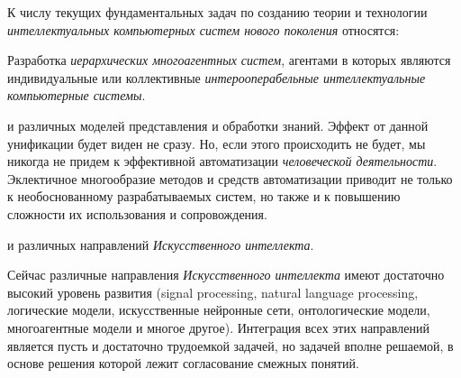 К числу текущих фундаментальных задач по созданию теории и технологии \textit{интеллектуальных компьютерных систем нового поколения} относятся:
\begin{textitemize}
	\item Разработка  \textit{иерархических многоагентных систем}, агентами в которых являются индивидуальные или коллективные \textit{интерооперабельные интеллектуальные компьютерные системы}.
	
	\item {} и  различных моделей представления и обработки знаний. Эффект от данной унификации будет виден не сразу. Но, если этого происходить не будет, мы никогда не придем к эффективной  автоматизации \textit{человеческой деятельности}. Эклектичное многообразие методов и средств автоматизации приводит не только к необоснованному  разрабатываемых систем, но также и к повышению сложности их использования и сопровождения.
	
	\item {} и  различных направлений \textit{Искусственного интеллекта}.
	
	Сейчас различные направления \textit{Искусственного интеллекта} имеют достаточно высокий уровень развития (signal processing, natural language processing, логические модели, искусственные нейронные сети, онтологические модели, многоагентные модели и многое другое). Интеграция всех этих направлений является пусть и достаточно трудоемкой задачей, но задачей вполне решаемой, в основе решения которой лежит согласование смежных понятий.
	

\end{textitemize}
